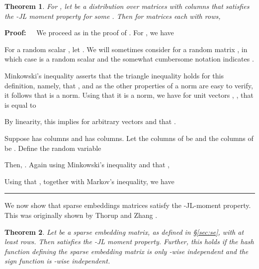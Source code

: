 \documentclass[11pt]{article}
\newtheorem{theorem}{Theorem}
\newenvironment{proof}{\begin{trivlist} \item {\bf Proof:~~}}
  {\qed\end{trivlist}}
\def\qed{\hfill\rule{2mm}{2mm}}
\begin{document}
\begin{theorem}\label{thm:jlamp}\cite{kn14}
For , let  be a distribution over matrices with  columns
that satisfies the -JL moment property for some . Then for 
matrices each with  rows,

\end{theorem}
\begin{proof}
We proceed as in the proof of \cite{kn14}. 
For , we have

For a random scalar , let . 
We will sometimes consider  for a random matrix , 
in which case  is a random scalar
and the somewhat cumbersome notation  indicates . 

Minkowski's inequality asserts that the triangle
inequality holds for this definition, namely, that , and as the
other properties of a norm are easy to verify, it follows that  is a norm. Using that it is a norm, we have
for unit vectors , , that  is equal to

By linearity, this implies for arbitrary vectors  and  that
. 

Suppose  has  columns and  has  columns. 
Let the columns of  be  and the columns of  be . 
Define the random variable 

Then, . Again using Minkowski's inequality and that ,

Using that , together with Markov's inequality, we have

\end{proof}
We now show that sparse embeddings matrices satisfy the -JL-moment property. This was originally shown
by Thorup and Zhang \cite{tz12}.
\begin{theorem}\label{thm:tz}
Let  be a sparse embedding matrix, as defined in \S\ref{sec:se}, with at least  rows. Then 
 satisfies the -JL moment property. Further, this holds if the hash function  defining the 
sparse embedding matrix is only -wise independent and the sign function  is -wise independent. 
\end{theorem}
\end{document}
